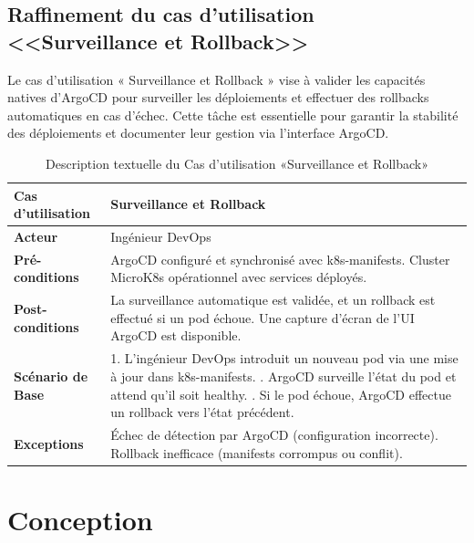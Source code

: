   \subsection{Raffinement du cas d'utilisation <<Surveillance et Rollback>>}
  Le cas d’utilisation « Surveillance et Rollback » vise à valider les capacités natives d’ArgoCD pour surveiller les déploiements et effectuer des rollbacks automatiques en cas d’échec. Cette tâche est essentielle pour garantir la stabilité des déploiements et documenter leur gestion via l’interface ArgoCD.
  \newpage
  \begin{table}[!ht]
      \centering
      \caption{Description textuelle du Cas d’utilisation «Surveillance et Rollback»}
      \label{tab:surveillance_rollback}
      \renewcommand{\arraystretch}{1.2}
      \begin{tabular}{|p{4.2cm}|p{11cm}|}
      \hline
      \textbf{Cas d'utilisation} & Surveillance et Rollback \\
      \hline
      \textbf{Acteur} & Ingénieur DevOps \\
      \hline
      \textbf{Pré-conditions} & ArgoCD configuré et synchronisé avec k8s-manifests. \newline Cluster MicroK8s opérationnel avec services déployés. \\
      \hline
      \textbf{Post-conditions} & La surveillance automatique est validée, et un rollback est effectué si un pod échoue. \newline Une capture d’écran de l’UI ArgoCD est disponible. \\
      \hline
      \textbf{Scénario de Base} & 
      1. L’ingénieur DevOps introduit un nouveau pod via une mise à jour dans k8s-manifests. \newline
      2. ArgoCD surveille l’état du pod et attend qu’il soit healthy. \newline
      3. Si le pod échoue, ArgoCD effectue un rollback vers l’état précédent. \\
      \hline
      \textbf{Exceptions} & 
      Échec de détection par ArgoCD (configuration incorrecte). \newline Rollback inefficace (manifests corrompus ou conflit). \\
      \hline
      \end{tabular}
  \end{table}
  \section{Conception}
